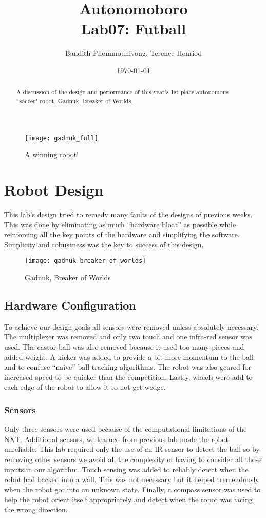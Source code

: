 \documentclass{article}
\title{Autonomoboro \\ Lab07: Futball}
\author{Bandith Phommounivong, Terence Henriod}
\date{\today}
\begin{document}
\maketitle

\begin{abstract}
A discussion of the design and performance of this year's 1st place autonomous ``soccer" robot, Gadnuk, Breaker of Worlds.
\end{abstract}

  \begin{figure}[h]
  \centering
  \texttt{[image: gadnuk\_full]}
  \caption{A winning robot!}
  \label{fig:winner}
  \end{figure}

\newpage
\section{Robot Design}
This lab’s design tried to remedy many faults of the designs of previous weeks. This was done by eliminating as much “hardware bloat” as possible while reinforcing all the key points of the hardware and simplifying the software. Simplicity and robustness was the key to success of this design.

  \begin{figure}[h]
  \centering
  \texttt{[image: gadnuk\_breaker\_of\_worlds]}
  \caption{Gadnuk, Breaker of Worlds}
  \label{fig:gadnuk_breaker}
  \end{figure}

\subsection{Hardware Configuration}
To achieve our design goals all sensors were removed unless absolutely necessary. The multiplexer was removed and only two touch and one infra-red sensor was used. The castor ball was also removed because it used too many pieces and added weight. A kicker was added to provide a bit more momentum to the ball and to confuse “naive” ball tracking algorithms. The robot was also geared for increased speed to be quicker than the competition. Lastly, wheels were add to each edge of the robot to allow it to not get wedge. 

\subsubsection{Sensors}
Only three sensors were used because of the computational limitations of the NXT. Additional sensors, we learned from previous lab made the robot unreliable. This lab required only the use of an IR sensor to detect the ball so by removing other sensors we avoid all the complexity of having to consider all those inputs in our algorithm. Touch sensing was added to reliably detect when the robot had backed into a wall. This was not necessary but it helped tremendously when the robot got into an unknown state. Finally, a compass sensor was used to help the robot orient itself appropriately and detect when the robot was facing the wrong direction.
\end{document}
